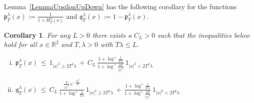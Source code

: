 \documentclass[10pt]{article}
\numberwithin{equation}{section}
\newtheorem{corollary}[theorem]{Corollary}
\theoremstyle{definition}
\newcommand{\R}{{\mathbb R}}
\begin{document}
Lemma~\ref{LemmaUpsilonUpDown} has the following corollary for the functions
  $\mathfrak{p}_T^{\lambda}(x):=\frac{1}{1+H^{\lambda}_T(x)  }$  and $\mathfrak{q}_T^{\lambda}(x):=1-\mathfrak{p}_T^{\lambda}(x)$.
\begin{corollary}\label{CorollaryThePandQ}  For any $L>0$ there exists a  $C_L>0$ such that the inequalities below hold for all $x\in \R^2$ and $T,\lambda>0$ with $T\lambda \leq L$.
\begin{enumerate}[(i)]
\item  $\displaystyle \mathfrak{p}_T^{\lambda}(x)\,\leq \, 1_{ |x|^2\geq 2T^2\lambda  }\,+\, C_L\,\frac{1+\log^+\frac{1}{T\lambda }  }{1+ \log^{+} \frac{2T}{|x|^2}    } \,  1_{ |x|^2 < 2T^2\lambda  }$

    \item  $\displaystyle \mathfrak{q}_T^{\lambda}(x)\,\leq \, C_L\,\frac{ \frac{T}{|x|^2}\,e^{-\frac{|x|^2}{2T}}  }{ 1+\log^+\frac{1}{T\lambda}   } \, 1_{ |x|^2\geq 2T^2\lambda  }\,+\, \frac{1+\log^+\frac{1}{T\lambda }  }{1+ \log^{+} \frac{2T}{|x|^2}    } \,  1_{ |x|^2 < 2T^2\lambda  }$


\end{enumerate}


\end{corollary}











 
 
\end{document}
